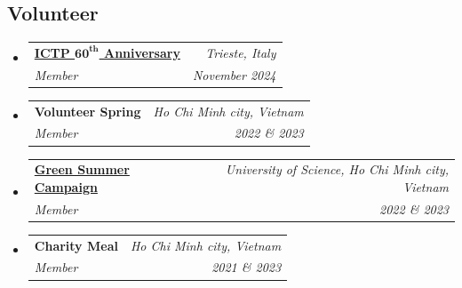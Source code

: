 \documentclass[letterpaper,11pt]{article}
\makeatletter
\newcommand{\resumeOrganizationHeading}[4]{
	\vspace{-2pt}\item
	\begin{tabular*}{0.97\textwidth}[t]{l@{\extracolsep{\fill}}r}
		\textbf{#1} & \textit{\small #2} \\
		\textit{\small#3} & \textit{\small #4} 
	\end{tabular*}\vspace{-7pt}
}
\newcommand{\resumeSubHeadingListStart}{\begin{itemize}[leftmargin=0.15in, label={}]}
\newcommand{\resumeSubHeadingListEnd}{\end{itemize}}
\newcommand{\resumeItemListStart}{\begin{itemize}}
\newcommand{\resumeItemListEnd}{\end{itemize}\vspace{-5pt}}
\makeatother
\begin{document}
\subsection*{Volunteer}
\resumeSubHeadingListStart
\resumeOrganizationHeading{\href{https://ilpiccolo.gelocal.it/trieste/cronaca/2024/11/15/news/ictp_trieste_60_anni_scienza-14808715/}{ICTP \(\textbf{60}^{\textbf{th}}\) Anniversary\faLink}}{Trieste, Italy}{Member}{November 2024}
\resumeOrganizationHeading{Volunteer Spring}{Ho Chi Minh city, Vietnam}{Member}{2022 \& 2023}
\resumeOrganizationHeading{\href{https://fb.watch/wZd1tcJeh3?t=860
}{Green Summer Campaign\faLink}}{University of Science, Ho Chi Minh city, Vietnam}{Member}{2022 \& 2023}
\resumeOrganizationHeading{Charity Meal}{Ho Chi Minh city, Vietnam}{Member}{2021 \& 2023}
\resumeSubHeadingListEnd
\end{document}
